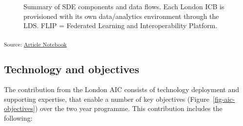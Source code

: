\documentclass[
  letterpaper,
  DIV=11,
  numbers=noendperiod]{scrartcl}
\begin{document}
\begin{figure}


\caption{\label{fig-sde-summary}Summary of SDE components and data
flows. Each London ICB is provisioned with its own data/analytics
environment through the LDS. FLIP = Federated Learning and
Interoperability Platform.}

\end{figure}%

\textsubscript{Source:
\href{https://d3london.github.io/sde_aic_docs/index.qmd.html}{Article
Notebook}}

\subsection{Technology and objectives}\label{technology-and-objectives}

The contribution from the London AIC consists of technology deployment
and supporting expertise, that enable a number of key objectives
(Figure~\ref{fig-aic-objectives}) over the two year programme. This
contribution includes the following:
\end{document}
